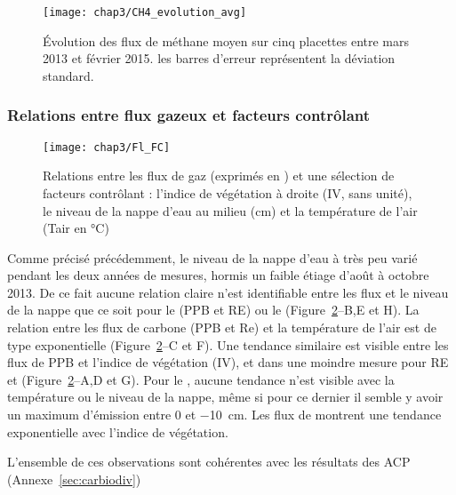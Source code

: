 \begin{figure}
\centering
\texttt{[image: chap3/CH4\_evolution\_avg]}
\caption{Évolution des flux de méthane moyen sur cinq placettes entre mars 2013 et février 2015. les barres d'erreur représentent la déviation standard.}
\label{fig:CH4_evolution_avg}
\end{figure}



\subsubsection{Relations entre flux gazeux et facteurs contrôlant}

\begin{figure}[!htb]
\centering
\texttt{[image: chap3/Fl\_FC]}
\caption{Relations entre les flux de gaz (exprimés en \si{\uml}) et une sélection de facteurs contrôlant : l'indice de végétation à droite (IV, sans unité), le niveau de la nappe d'eau au milieu (cm) et la température de l'air (Tair en \si{\degreeCelsius})}
\label{fig:Fl_FC}
\end{figure}

Comme précisé précédemment, le niveau de la nappe d'eau à très peu varié pendant les deux années de mesures, hormis un faible étiage d'août à octobre 2013.
De ce fait aucune relation claire n'est identifiable entre les flux et le niveau de la nappe que ce soit pour le \coo (PPB et RE) ou le \chh (Figure~\ref{fig:Fl_FC}--B,E et H).
La relation entre les flux de carbone (PPB et Re) et la température de l'air est de type exponentielle (Figure~\ref{fig:Fl_FC}--C et F).
Une tendance similaire est visible entre les flux de PPB et l'indice de végétation (IV), et dans une moindre mesure pour RE et \chh (Figure~\ref{fig:Fl_FC}--A,D et G).
Pour le \chh, aucune tendance n'est visible avec la température ou le niveau de la nappe, même si pour ce dernier il semble y avoir un maximum d'émission entre 0 et \SI{-10}{\centi\metre}.
Les flux de \chh montrent une tendance exponentielle avec l'indice de végétation.

L'ensemble de ces observations sont cohérentes avec les résultats des ACP (Annexe~\ref{sec:carbiodiv})

